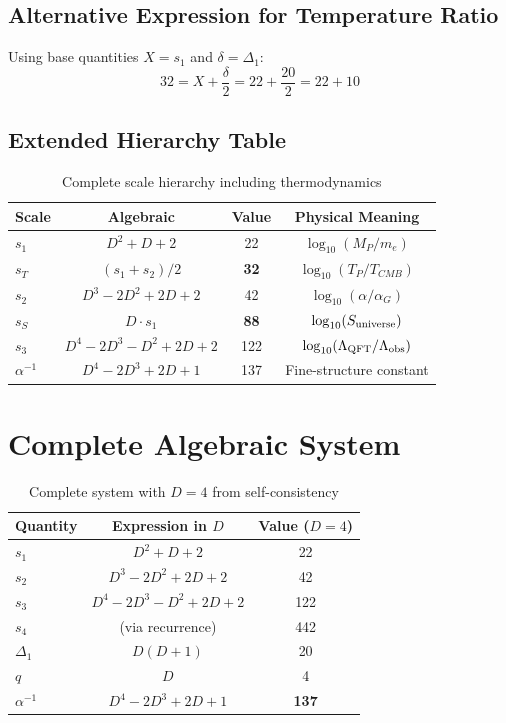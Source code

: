 \documentclass[11pt,a4paper]{article}
\begin{document}
\subsection{Alternative Expression for Temperature Ratio}

Using base quantities $X = s_1$ and $\delta = \Delta_1$:
\begin{equation}
32 = X + \frac{\delta}{2} = 22 + \frac{20}{2} = 22 + 10
\end{equation}

\subsection{Extended Hierarchy Table}

\begin{table}[h]
\centering
\caption{Complete scale hierarchy including thermodynamics}
\label{tab:thermodynamic}
\begin{tabular}{lccc}
\hline
Scale & Algebraic & Value & Physical Meaning \\
\hline
$s_1$ & $D^2 + D + 2$ & 22 & $\log_{10}(M_P/m_e)$ \\
$s_T$ & $(s_1 + s_2)/2$ & \textbf{32} & $\log_{10}(T_P/T_{CMB})$ \\
$s_2$ & $D^3 - 2D^2 + 2D + 2$ & 42 & $\log_{10}(\alpha/\alpha_G)$ \\
$s_S$ & $D \cdot s_1$ & \textbf{88} & $\log_{10}(S_{\rm universe})$ \\
$s_3$ & $D^4 - 2D^3 - D^2 + 2D + 2$ & 122 & $\log_{10}(\Lambda_{\rm QFT}/\Lambda_{\rm obs})$ \\
$\alpha^{-1}$ & $D^4 - 2D^3 + 2D + 1$ & 137 & Fine-structure constant \\
\hline
\end{tabular}
\end{table}

\section{Complete Algebraic System}

\begin{table}[h]
\centering
\caption{Complete system with $D=4$ from self-consistency}
\label{tab:complete}
\begin{tabular}{lcc}
\hline
Quantity & Expression in $D$ & Value ($D=4$) \\
\hline
$s_1$ & $D^2 + D + 2$ & 22 \\
$s_2$ & $D^3 - 2D^2 + 2D + 2$ & 42 \\
$s_3$ & $D^4 - 2D^3 - D^2 + 2D + 2$ & 122 \\
$s_4$ & (via recurrence) & 442 \\
$\Delta_1$ & $D(D+1)$ & 20 \\
$q$ & $D$ & 4 \\
$\alpha^{-1}$ & $D^4 - 2D^3 + 2D + 1$ & \textbf{137} \\
\hline
\end{tabular}
\end{table}
\end{document}
